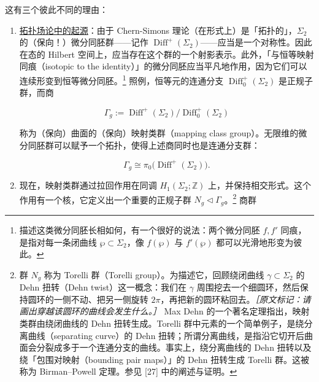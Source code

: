 这有三个彼此不同的理由：

\begin{enumerate}
  \item \underline{拓扑场论中的起源}：由于 Chern-Simons 理论（在形式上）是「拓扑的」，$\Sigma_2$ 的（保向！）微分同胚群——记作 $\operatorname{Diff}^+(\Sigma_2)$——应当是一个对称性。因此在态的 Hilbert 空间上，应当存在这个群的一个射影表示。此外，「与恒等映射同痕（isotopic to the identity）」的微分同胚应当平凡地作用，因为它们可以连续形变到恒等微分同胚。\footnote{描述这类微分同胚长相如何，有一个很好的说法：两个微分同胚 $f,f'$ 同痕，是指对每一条闭曲线 $\wp\subset\Sigma_2$，像 $f(\wp)$ 与 $f'(\wp)$ 都可以光滑地形变为彼此。} 照例，恒等元的连通分支 $\operatorname{Diff}^+_0(\Sigma_2)$ 是正规子群，而商

  \begin{equation}
    \Gamma_g:=\operatorname{Diff}^+(\Sigma_2)/\operatorname{Diff}^+_0(\Sigma_2)
    \tag{2.225}
    \label{eq:2.225}
  \end{equation}

  称为（保向）曲面的（保向）映射类群（mapping class group）。无限维的微分同胚群可以赋予一个拓扑，使得上述商同时也是连通分支群：

  \begin{equation}
    \Gamma_g\cong\pi_0\big(\operatorname{Diff}^+(\Sigma_2)\big).
    \tag{2.226}
    \label{eq:2.226}
  \end{equation}

  \item 现在，映射类群通过拉回作用在同调 $H_1(\Sigma_2;\mathbb{Z})$ 上，并保持相交形式。这个作用有一个核，它定义出一个重要的正规子群 $N_g\triangleleft\Gamma_g$。\footnote{群 $N_g$ 称为 Torelli 群（Torelli group）。为描述它，回顾绕闭曲线 $\gamma\subset\Sigma_2$ 的 Dehn 扭转（Dehn twist）这一概念：我们在 $\gamma$ 周围挖去一个细圆环，然后保持圆环的一侧不动、把另一侧旋转 $2\pi$，再把新的圆环粘回去。{\small\itshape ［原文标记：请画出穿越该圆环的曲线会发生什么。］} Max Dehn 的一个著名定理指出，映射类群由绕闭曲线的 Dehn 扭转生成。Torelli 群中元素的一个简单例子，是绕分离曲线（separating curve）的 Dehn 扭转；所谓分离曲线，是指沿它切开后曲面会分裂成多于一个连通分支的曲线。事实上，绕分离曲线的 Dehn 扭转以及绕「包围对映射（bounding pair maps）」的 Dehn 扭转生成 Torelli 群。这被称为 Birman–Powell 定理。参见 [27] 中的阐述与证明。} 商群


\end{enumerate}
